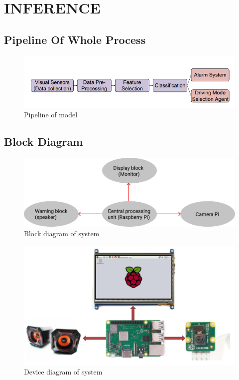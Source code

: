 \chapter{INFERENCE}

\renewcommand{\headrulewidth}{0.5pt}
\renewcommand{\footrulewidth}{0.5pt}
\thispagestyle{plain}
\pagestyle{fancy}
\fancyhf{}
\raggedright
{}

\justifying

\section{Pipeline Of Whole Process}
    \begin{figure}[H]
        \centering
        \includegraphics[width=0.6\linewidth]{img/pipeline.png}
        \caption{Pipeline of model}
    \end{figure}

\section{Block Diagram}
    \begin{figure}[H]
        \centering
        \includegraphics[width=0.6\linewidth]{img/block-diagram.png}
        \caption{Block diagram of system}
    \end{figure}
    \begin{figure}[H]
        \centering
        \includegraphics[width=0.6\linewidth]{img/Device-diagram.png}
        \caption{Device diagram of system}
    \end{figure}

